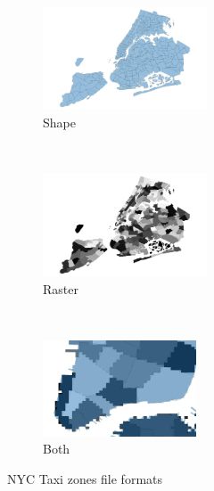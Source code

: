 \documentclass{sigkddExp}
\begin{document}
\begin{figure}
\label{fig:zones}
    \centering
    \begin{subfigure}[t]{0.25\textwidth}
        \centering
        \label{fig:zones_shape}
        \includegraphics[height=1.2in]{images/taxi_zones_shape}
        \caption{Shape}
    \end{subfigure}%
    ~ 
    \begin{subfigure}[t]{0.25\textwidth}
        \centering
        \label{fig:zones_raster}
        \includegraphics[height=1.2in]{images/taxi_zones_raster}
        \caption{Raster}
    \end{subfigure}
    ~ 
    \begin{subfigure}[t]{0.5\textwidth}
        \centering
        \label{fig:zones_both}
        \includegraphics[width=0.5\textwidth]{images/both}
        \caption{Both}
    \end{subfigure}
    \caption{NYC Taxi zones file formats}
\end{figure}
\end{document}
